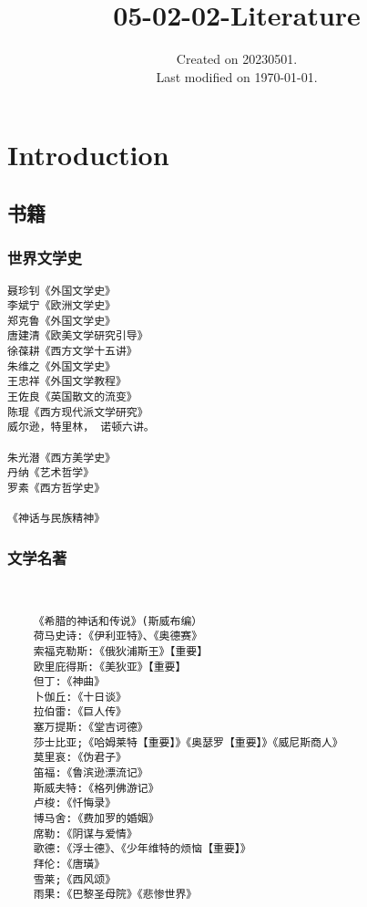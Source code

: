 \documentclass[UTF8]{../../RepresentationUniverse}
\begin{document}
\title{05-02-02-Literature}
\date{Created on 20230501.\\   Last modified on \today.}
\maketitle
\tableofcontents


\chapter{Introduction}


\section{书籍}





\subsection{世界文学史}

\begin{lstlisting}
聂珍钊《外国文学史》
李斌宁《欧洲文学史》
郑克鲁《外国文学史》
唐建清《欧美文学研究引导》
徐葆耕《西方文学十五讲》
朱维之《外国文学史》
王忠祥《外国文学教程》
王佐良《英国散文的流变》
陈琨《西方现代派文学研究》
威尔逊，特里林， 诺顿六讲。

朱光潜《西方美学史》
丹纳《艺术哲学》
罗素《西方哲学史》

《神话与民族精神》
\end{lstlisting}



\subsection{文学名著}


\begin{lstlisting}


    《希腊的神话和传说》(斯威布编）
    荷马史诗:《伊利亚特》、《奥德赛》
    索福克勒斯:《俄狄浦斯王》【重要】
    欧里庇得斯:《美狄亚》【重要】
    但丁:《神曲》
    卜伽丘:《十日谈》
    拉伯雷:《巨人传》
    塞万提斯:《堂吉诃德》
    莎士比亚;《哈姆莱特【重要】》《奥瑟罗【重要】》《威尼斯商人》
    莫里哀:《伪君子》
    笛福:《鲁滨逊漂流记》
    斯威夫特:《格列佛游记》
    卢梭:《忏悔录》
    博马舍:《费加罗的婚姻》
    席勒:《阴谋与爱情》
    歌德:《浮士德》、《少年维特的烦恼【重要】》
    拜伦:《唐璜》
    雪莱;《西风颂》
    雨果:《巴黎圣母院》《悲惨世界》



\end{lstlisting}
\end{document}
